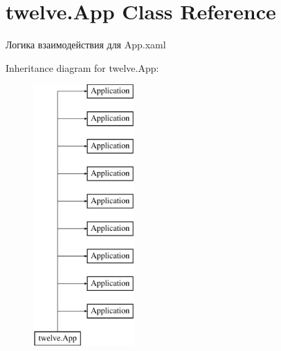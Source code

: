 \hypertarget{classtwelve_1_1_app}{}\section{twelve.\+App Class Reference}
\label{classtwelve_1_1_app}


Логика взаимодействия для App.\+xaml  


Inheritance diagram for twelve.\+App\+:\begin{figure}[H]
\begin{center}
\leavevmode
\includegraphics[height=10.000000cm]{classtwelve_1_1_app}
\end{center}
\end{figure}
